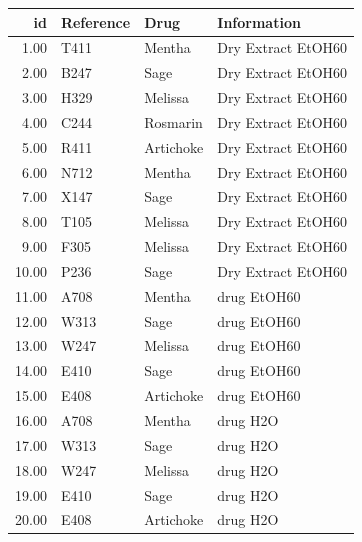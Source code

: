 \documentclass[a4paper]{article}\usepackage[]{graphicx}\usepackage[]{color}
\begin{document}
\begin{longtable}{rlll}
  \hline
id & Reference & Drug & Information \\ 
  \hline
1.00 & T411 & Mentha & Dry Extract EtOH60 \\ 
  2.00 & B247 & Sage & Dry Extract EtOH60 \\ 
  3.00 & H329 & Melissa & Dry Extract EtOH60 \\ 
  4.00 & C244 & Rosmarin & Dry Extract EtOH60 \\ 
  5.00 & R411 & Artichoke & Dry Extract EtOH60 \\ 
  6.00 & N712 & Mentha & Dry Extract EtOH60 \\ 
  7.00 & X147 & Sage & Dry Extract EtOH60 \\ 
  8.00 & T105 & Melissa & Dry Extract EtOH60 \\ 
  9.00 & F305 & Melissa & Dry Extract EtOH60 \\ 
  10.00 & P236 & Sage & Dry Extract EtOH60 \\ 
  11.00 & A708 & Mentha & drug EtOH60 \\ 
  12.00 & W313 & Sage & drug EtOH60 \\ 
  13.00 & W247 & Melissa & drug EtOH60 \\ 
  14.00 & E410 & Sage & drug EtOH60 \\ 
  15.00 & E408 & Artichoke & drug EtOH60 \\ 
  16.00 & A708 & Mentha & drug H2O \\ 
  17.00 & W313 & Sage & drug H2O \\ 
  18.00 & W247 & Melissa & drug H2O \\ 
  19.00 & E410 & Sage & drug H2O \\ 
  20.00 & E408 & Artichoke & drug H2O \\ 
   \hline
\hline
\end{longtable}
\end{document}
